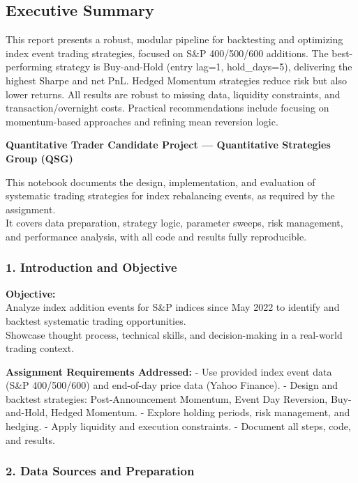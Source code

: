 \documentclass[11pt]{article}
\begin{document}
    \subsection*{Executive Summary}\label{executive-summary}

This report presents a robust, modular pipeline for backtesting and
optimizing index event trading strategies, focused on S\&P 400/500/600
additions. The best-performing strategy is Buy-and-Hold (entry lag=1,
hold\_days=5), delivering the highest Sharpe and net PnL. Hedged
Momentum strategies reduce risk but also lower returns. All results are
robust to missing data, liquidity constraints, and transaction/overnight
costs. Practical recommendations include focusing on momentum-based
approaches and refining mean reversion logic.

    \textbf{Quantitative Trader Candidate Project --- Quantitative
Strategies Group (QSG)}

This notebook documents the design, implementation, and evaluation of
systematic trading strategies for index rebalancing events, as required
by the assignment.\\
It covers data preparation, strategy logic, parameter sweeps, risk
management, and performance analysis, with all code and results fully
reproducible.

    \subsubsection*{1. Introduction and
Objective}\label{introduction-and-objective}

\textbf{Objective:}\\
Analyze index addition events for S\&P indices since May 2022 to
identify and backtest systematic trading opportunities.\\
Showcase thought process, technical skills, and decision-making in a
real-world trading context.

\textbf{Assignment Requirements Addressed:} - Use provided index event
data (S\&P 400/500/600) and end-of-day price data (Yahoo Finance). -
Design and backtest strategies: Post-Announcement Momentum, Event Day
Reversion, Buy-and-Hold, Hedged Momentum. - Explore holding periods,
risk management, and hedging. - Apply liquidity and execution
constraints. - Document all steps, code, and results.

    \subsubsection*{2. Data Sources and
Preparation}\label{data-sources-and-preparation}
\end{document}
